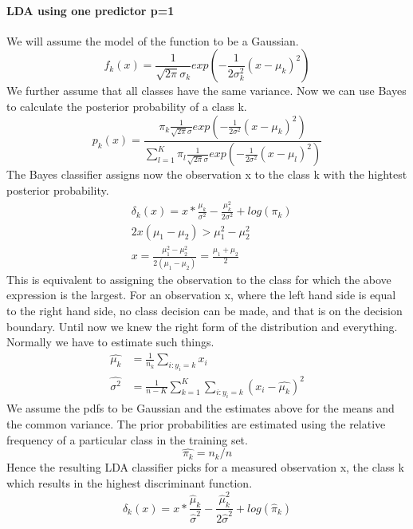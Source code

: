 \documentclass[../document.tex]{subfiles}
\begin{document}
	\paragraph{LDA using one predictor p=1}
	We will assume the model of the function to be a Gaussian.
	\begin{equation}
		f_{k}(x)=\frac{1}{\sqrt{2\pi}\sigma_{k}}exp(-\frac{1}{2\sigma_{k}^2}(x-\mu_{k})^2)
	\end{equation}
	We further assume that all classes have the same variance. Now we can use Bayes to calculate the posterior probability of a class k.
	\begin{equation}
	p_{k}(x)=\frac{\pi_{k}\frac{1}{\sqrt{2\pi}\sigma}exp(-\frac{1}{2\sigma^2}(x-\mu_{k})^2)}{\sum_{l=1}^{K}\pi_{l}\frac{1}{\sqrt{2\pi}\sigma}exp(-\frac{1}{2\sigma^2}(x-\mu_{l})^2)}
	\end{equation}
	The Bayes classifier assigns now the observation x to the class k with the hightest posterior probability.
	\begin{equation}
	\begin{split}
		&\delta_{k}(x)=x*\frac{\mu_{k}}{\sigma^2}-\frac{\mu_{k}^2}{2\sigma^2}+log(\pi_{k})\\
		&2x(\mu_{1}-\mu_{2})>\mu_{1}^2-\mu_{2}^2\\
		&x=\frac{\mu_{1}^2-\mu_{2}^2}{2(\mu_{1}-\mu_{2})}=\frac{\mu_{1}+\mu_{2}}{2}
	\end{split}
	\end{equation}
	This is equivalent to assigning the observation to the class for which the above expression is the largest.
	For an observation x, where the left hand side is equal to the right hand side, no class decision can be made, and that is on the decision boundary. Until now we knew the right form of the distribution and everything. Normally we have to estimate such things.
	\begin{equation}
	\begin{split}
		\hat{\mu_{k}}&=\frac{1}{n_{k}}\sum_{i:y_{i}=k}x_{i}\\
		\hat{\sigma^2}&=\frac{1}{n-K}\sum_{k=1}^{K}\sum_{i:y_{i}=k}(x_{i}-\hat{\mu_{k}})^2
	\end{split}
	\end{equation}
	We assume the pdfs to be Gaussian and the estimates above for the means and the common variance. The prior probabilities are estimated using the relative frequency of a particular class in the training set.
	\begin{equation}
		\hat{\pi_{k}}=n_{k}/n
	\end{equation}
	Hence the resulting LDA classifier picks for a measured observation x, the class k which results in the highest discriminant function.
	\begin{equation}
		\hat{\delta}_{k}(x)=x*\frac{\hat{\mu}_{k}}{\hat{\sigma}^2}-\frac{\hat{\mu}_{k}^2}{2\hat{\sigma}^2}+log(\hat{\pi}_{k})
	\end{equation}
\end{document}
